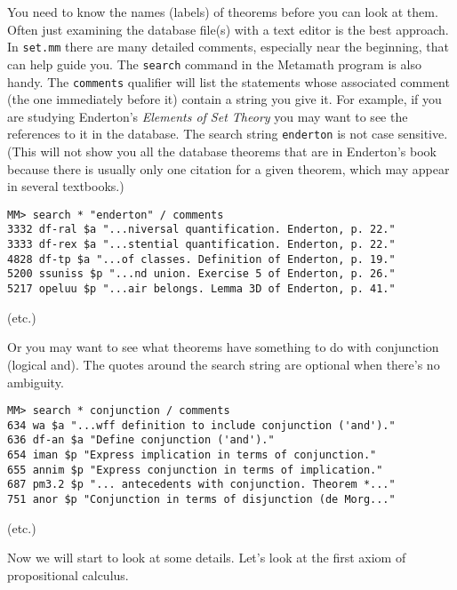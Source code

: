 You need to know the names (labels) of theorems before you can look at them.
Often just examining the database file(s) with a text editor is the best
approach.  In \texttt{set.mm} there are many detailed comments, especially near
the beginning, that can help guide you. The \texttt{search} command in the
Metamath program is also handy.  The \texttt{comments} qualifier will list the
statements whose associated comment (the one immediately before it) contain a
string you give it.  For example, if you are studying Enderton's {\em Elements
of Set Theory} \cite{Enderton} you may want to see
the references to it in the database.  The search string \texttt{enderton} is not
case sensitive.  (This will not show you all the database theorems that are in
Enderton's book because there is usually only one citation for a given
theorem, which may appear in several textbooks.)

\begin{verbatim}
MM> search * "enderton" / comments
3332 df-ral $a "...niversal quantification. Enderton, p. 22."
3333 df-rex $a "...stential quantification. Enderton, p. 22."
4828 df-tp $a "...of classes. Definition of Enderton, p. 19."
5200 ssuniss $p "...nd union. Exercise 5 of Enderton, p. 26."
5217 opeluu $p "...air belongs. Lemma 3D of Enderton, p. 41."
\end{verbatim}
\begin{center}
(etc.)
\end{center}

Or you may want to see what theorems have something to do with
conjunction (logical {\sc and}).  The quotes around the search
string are optional when there's no ambiguity.

\begin{verbatim}
MM> search * conjunction / comments
634 wa $a "...wff definition to include conjunction ('and')."
636 df-an $a "Define conjunction ('and')."
654 iman $p "Express implication in terms of conjunction."
655 annim $p "Express conjunction in terms of implication."
687 pm3.2 $p "... antecedents with conjunction. Theorem *..."
751 anor $p "Conjunction in terms of disjunction (de Morg..."
\end{verbatim}
\begin{center}
(etc.)
\end{center}


Now we will start to look at some details.  Let's look at the first
axiom of propositional calculus.


